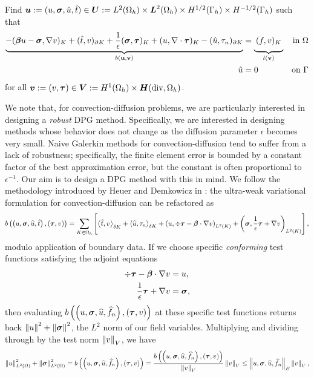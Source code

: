 \documentclass[Proposal.tex]{subfiles}
\begin{document}
Find
$\boldsymbol{u}:=(u,\boldsymbol\sigma,\hat u,\hat t)
\in\boldsymbol{U}:=L^2(\Omega_h)\times \boldsymbol{L}^2(\Omega_h)\times H^{1/2}(\Gamma_h)\times H^{-1/2}(\Gamma_h)$
such that
\begin{align}
\label{eq:variationalFormulation}
\underbrace{-(\bfbeta u-\bfsigma,\nabla v)_K+(\hat t,v)_{\partial K}
+ \frac{1}{\epsilon}(\bfsigma,\bftau)_K
+(u,\nabla\cdot\bftau)_K
-(\hat u,\tau_n)_{\partial K}}_{b(\mathbf{u}, \mathbf{v})}
&=\underbrace{\:(f,v)_K\genfrac{}{}{0pt}{}{}{}}_{l(\mathbf{v})} &\text{in }\Omega \\
\hat u&=0 &\text{on }\Gamma
\end{align}
for all $\boldsymbol{v}:=(v,\boldsymbol\tau)\in
\boldsymbol{V}:=H^1(\Omega_h)\times\mbox{\boldmath $H$}(\text{div},\Omega_h)$.


We note that, for convection-diffusion problems, we are particularly
interested in designing a \textit{robust} DPG method.  Specifically, we are
interested in designing methods whose behavior does not change as the
diffusion parameter $\epsilon$ becomes very small.  Naive Galerkin methods for
convection-diffusion tend to suffer from a lack of robustness; specifically,
the finite element error is bounded by a constant factor of the best
approximation error, but the constant is often proportional to
$\epsilon^{-1}$.  Our aim is to design a DPG method with this in mind.  We
follow the methodology introduced by Heuer and Demkowicz in
\cite{DemkowiczHeuer}: the ultra-weak variational formulation for
convection-diffusion can be refactored as
\[
b\left( \left( u,\boldsymbol\sigma,\widehat{u},\hat t \right),\left( \boldsymbol\tau,v \right) \right) =
\sum_{K\in \Omega_h}\left[ \left\langle \hat t,v \right\rangle_{\delta K}
+\left\langle \widehat{u},\tau_n \right\rangle_{\delta K} + \left( u,\div \boldsymbol\tau
-\boldsymbol\beta\cdot\nabla v \right)_{L^2(K)}
+\left( \boldsymbol\sigma,\frac{1}{\epsilon} \boldsymbol\tau + \nabla v \right)_{L^2(K)} \right],
\]
modulo application of boundary data.  If we choose specific
\textit{conforming} test functions satisfying the adjoint equations
\begin{align*}
\div \boldsymbol\tau - \boldsymbol\beta \cdot \nabla v &= u,\\
\frac{1}{\epsilon} \boldsymbol\tau + \nabla v &= \boldsymbol\sigma,
\end{align*}
then evaluating $b\left( \left( u,\boldsymbol\sigma,\widehat{u},\widehat{f}_n \right),\left( \boldsymbol\tau,v \right) \right)$ at these
specific test functions returns back $\left\| u \right\|^2 + \left\| \boldsymbol\sigma \right\|^2$, the $L^2$
norm of our field variables.  Multiplying and dividing through by the test
norm $\left\| v \right\|_V$, we have
\[
\left\| u \right\|_{L^2\left( \Omega \right)}^2 + \left\| \boldsymbol\sigma \right\|_{L^2\left( \Omega \right)}^2 =
b\left( \left( u,\boldsymbol\sigma,\widehat{u},\widehat{f}_n \right),\left( \boldsymbol\tau,v \right) \right) =
\frac{b\left( \left( u,\boldsymbol\sigma,\widehat{u},\widehat{f}_n \right),\left( \boldsymbol\tau,v \right) \right)}{\left\| v \right\|_V}\left\| v \right\|_V
\leq \left\| u,\boldsymbol\sigma,\widehat{u},\widehat{f}_n \right\|_E\left\| v \right\|_V,
\]
\end{document}
